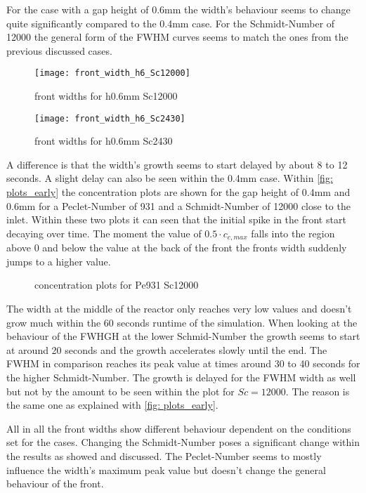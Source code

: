 \documentclass[../thesis.tex]{subfiles}
\begin{document}
For the case with a gap height of 0.6mm the width's behaviour seems to change quite significantly compared to the 0.4mm case. For the Schmidt-Number of 12000 the general form of the FWHM curves seems to match the ones from the previous discussed cases.
\begin{figure}[htbp]
	\centering
	\texttt{[image: front\_width\_h6\_Sc12000]}
	\caption{front widths for h0.6mm Sc12000\label{fig: front_width_h6_Sc12000}}\bigskip
	\texttt{[image: front\_width\_h6\_Sc2430]}
	\caption{front widths for h0.6mm Sc2430\label{fig: front_width_pos_h6_Sc2430}}
\end{figure}
A difference is that the width's growth seems to start delayed by about 8 to 12 seconds. A slight delay can also be seen within the 0.4mm case. Within \autoref{fig: plots_early} the concentration plots are shown for the gap height of 0.4mm and 0.6mm for a Peclet-Number of 931 and a Schmidt-Number of 12000 close to the inlet. Within these two plots it can seen that the initial spike in the front start decaying over time. The moment the value of $0.5 \cdot c_{c,max}$ falls into the region above 0 and below the value at the back of the front the fronts width suddenly jumps to a higher value.
\begin{figure}[htb]
	\centering
	\qquad
	\caption{concentration plots for Pe931 Sc12000}%
	\label{fig: plots_early}%
\end{figure}
The width at the middle of the reactor only reaches very low values and doesn't grow much within the 60 seconds runtime of the simulation. When looking at the behaviour of the FWHGH at the lower Schmid-Number the growth seems to start at around 20 seconds and the growth accelerates slowly until the end. The FWHM in comparison reaches its peak value at times around 30 to 40 seconds for the higher Schmidt-Number. The growth is delayed for the FWHM width as well but not by the amount to be seen within the plot for $Sc = 12000$. The reason is the same one as explained with \autoref{fig: plots_early}.

All in all the front widths show different behaviour dependent on the conditions set for the cases. Changing the Schmidt-Number poses a significant change within the results as showed and discussed. The Peclet-Number seems to mostly influence the width's maximum peak value but doesn't change the general behaviour of the front.
\end{document}
